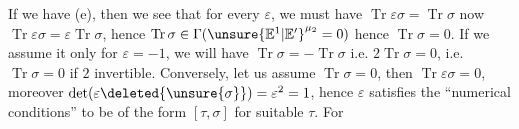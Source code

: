 If we have (e), then we see that for every  $\varepsilon$,
we must have $\operatorname{Tr}\varepsilon\sigma=\operatorname{Tr}\sigma$
now $\operatorname{Tr}\varepsilon\sigma=\varepsilon\operatorname{Tr}\sigma$, hence
$\operatorname{Tr}\sigma\in\Gamma(\unsure{\mathbb E^1|\mathbb E'}^{\mu_2}=0)$
hence $\operatorname{Tr}\sigma=0$. If we assume it only for $\varepsilon=-1$,
we will have $\operatorname{Tr}\sigma=-\operatorname{Tr}\sigma$ i.e.
$2\operatorname{Tr}\sigma=0$, i.e. $\operatorname{Tr}\sigma=0$ if $2$ invertible.
Conversely, let us assume $\operatorname{Tr}\sigma=0$, then
$\operatorname{Tr}\varepsilon\sigma=0$, moreover
$\det(\varepsilon\deleted{\unsure{\sigma}})=\varepsilon^2=1$, hence $\varepsilon$ satisfies
the ``numerical conditions'' to be of the form $[\tau,\sigma]$ for
suitable $\tau$. For